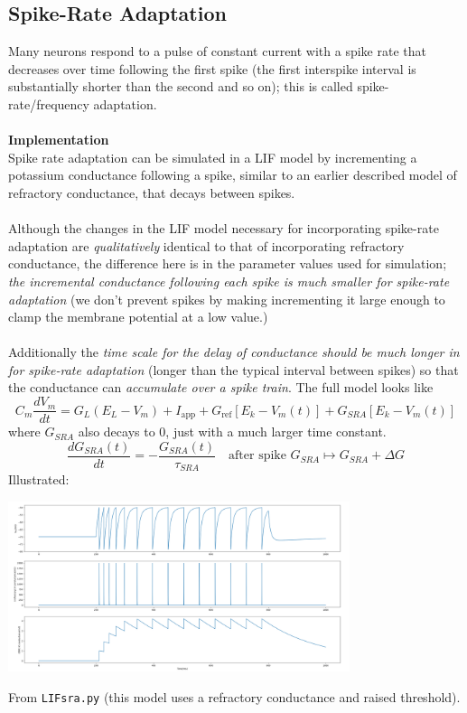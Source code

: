 \documentclass{report}
\begin{document}
\subsection{Spike-Rate Adaptation}
Many neurons respond to a pulse of constant current with a spike rate that decreases over time following the first spike (the first interspike interval is substantially shorter than the second and so on); this is called spike-rate/frequency adaptation.\\
\vspace{1mm}\\
\textbf{Implementation}\\
Spike rate adaptation can be simulated in a LIF model by incrementing a potassium conductance following a spike, similar to an earlier described model of refractory conductance, that decays between spikes.\\
\vspace{1mm}\\
Although the changes in the LIF model necessary for incorporating spike-rate adaptation are \textit{qualitatively} identical to that of incorporating refractory conductance, 
the difference here is in the parameter values used for simulation; \textit{the incremental conductance following each spike is much smaller for spike-rate adaptation} (we don't prevent spikes by making incrementing it large enough to clamp the membrane potential at a low value.)\\
\vspace{1mm}\\
Additionally the \textit{time scale for the delay of conductance should be much longer in for spike-rate adaptation} (longer than the typical interval between spikes) so that the 
conductance can \textit{accumulate over a spike train}. The full model looks like
\begin{equation*}
C_m\frac{dV_m}{dt}=G_L(E_L-V_m)+I_\text{app}+G_{\text{ref}}[E_k-V_m(t)]+G_{SRA}[E_k-V_m(t)]
\end{equation*}
where $G_{SRA}$ also decays to 0, just with a much larger time constant. 
\begin{equation*}
\frac{dG_{SRA}(t)}{dt}=-\frac{G_{SRA}(t)}{\tau_{SRA}}\quad\text{after spike }G_{SRA}\mapsto G_{SRA}+\Delta G
\end{equation*}
Illustrated:
\begin{center}
\includegraphics[width=10cm]{10}\\
\end{center}
From \texttt{LIFsra.py} (this model uses a refractory conductance and raised threshold).
\newpage
\end{document}
